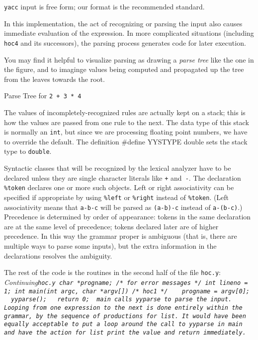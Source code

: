 {{\tt yacc} input is free form; our format is the recommended standard.

In this implementation, the act of recognizing or parsing the input
also causes immediate evaluation of the expression. In more
complicated situations (including {\tt hoc4} and its successors),
the parsing process generates code for later execution.

You may find it helpful to visualize parsing as drawing a
{\it parse tree\/} like the one in the figure, and to imaginge
values being computed and propagated up the tree from the leaves
towards the root.
\medskip
\centerline{}
\centerline{Parse Tree for {\tt 2 + 3 * 4}}
\medskip
\noindent
The values of incompletely-recognized rules are actually kept
on a stack; this is how the values are passed from one rule
to the next. The data type of this stack is normally an {\tt int},
but since we are processing floating point numbers, we have to
override the default. The definition
\begincode
#define YYSTYPE double
\endcode\noindent
sets the stack type to {\tt double}.

Syntactic classes that will be recognized by the lexical analyzer
have to be declared unless they are single character literals like
{\tt+} and~{\tt-}. The declaration {\tt\%token} declares one or
more such objects. Left or right associativity can be specified
if appropriate by using {\tt\%left} or {\tt\%right} instead of
{\tt\%token}. (Left associativity means that {\tt a-b-c} will
be parsed as {\tt(a-b)-c} instead of {\tt a-(b-c)}.)
Precedence is determined by order of appearance: tokens
in the same declaration are at the same level of precedence;
tokens declared later are of higher precedence. In this way
the grammar proper is ambiguous (that is, there are multiple
ways to parse some inputs), but the extra information in the
declarations resolves the ambiguity.

The rest of the code is the routines in the second half of the
file {\tt hoc.y}:
\begincode
~                       \it Continuing\/\tt hoc.y
char    *progname;       /* for error messages */
int     lineno = 1;
\medskip
int main(int argc, char *argv[])   /* hoc1 */
{
~       progname = argv[0];
~       yyparse();
~       return 0;
}
\endcode
\noindent
{\tt main} calls {\tt yyparse} to parse the input. Looping from
one expression to the next is done entirely within the grammar,
by the sequence of productions for {\tt list}. It would have been
equally acceptable to put a loop around the call to {\tt yyparse}
in {\tt main} and have the action for {\tt list} print the value
and return immediately.

}

